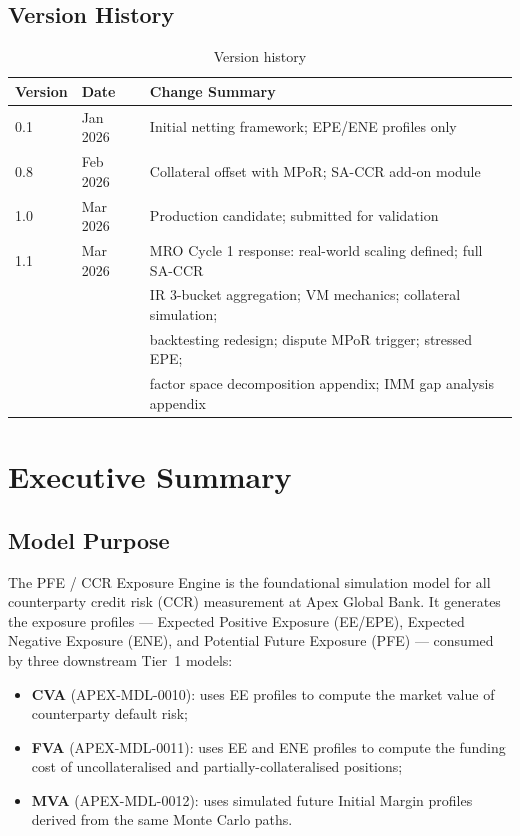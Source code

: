 \documentclass[11pt,a4paper]{article}
\begin{document}
\subsection{Version History}

\begin{table}[h!]
\centering
\begin{tabular}{@{}lll@{}}
\toprule
\textbf{Version} & \textbf{Date} & \textbf{Change Summary} \\
\midrule
0.1 & Jan 2026 & Initial netting framework; EPE/ENE profiles only \\
0.8 & Feb 2026 & Collateral offset with MPoR; SA-CCR add-on module \\
1.0 & Mar 2026 & Production candidate; submitted for validation \\
1.1 & Mar 2026 & MRO Cycle 1 response: real-world scaling defined; full SA-CCR \\
    &           & IR 3-bucket aggregation; VM mechanics; collateral simulation; \\
    &           & backtesting redesign; dispute MPoR trigger; stressed EPE; \\
    &           & factor space decomposition appendix; IMM gap analysis appendix \\
\bottomrule
\end{tabular}
\caption{Version history}
\end{table}

\section{Executive Summary}

\subsection{Model Purpose}

The PFE / CCR Exposure Engine is the foundational simulation model for all
counterparty credit risk (CCR) measurement at Apex Global Bank. It generates
the exposure profiles --- Expected Positive Exposure (EE/EPE), Expected Negative
Exposure (ENE), and Potential Future Exposure (PFE) --- consumed by three
downstream Tier~1 models:

\begin{itemize}[noitemsep]
  \item \textbf{CVA} (APEX-MDL-0010): uses EE profiles to compute the
        market value of counterparty default risk;
  \item \textbf{FVA} (APEX-MDL-0011): uses EE and ENE profiles to compute
        the funding cost of uncollateralised and partially-collateralised
        positions;
  \item \textbf{MVA} (APEX-MDL-0012): uses simulated future Initial Margin
        profiles derived from the same Monte Carlo paths.
\end{itemize}
\end{document}
